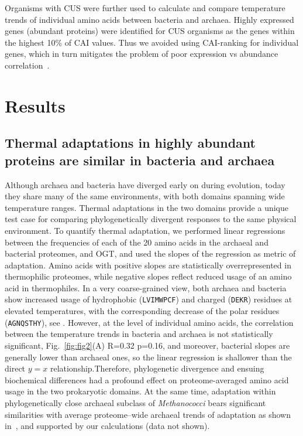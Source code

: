 \documentclass[10pt,letterpaper]{article}
\begin{document}
Organisms with CUS were further used to calculate and compare temperature trends of individual amino acids between bacteria and archaea. Highly expressed genes (abundant proteins) were identified for CUS organisms as the genes within the highest 10\% of CAI values. Thus we avoided using CAI-ranking for individual genes, which in turn mitigates the problem of poor expression vs abundance correlation~\cite{Maier2009Correlation}.


\section*{Results}

\subsection*{Thermal adaptations in highly abundant proteins are similar in bacteria and archaea}

Although archaea and bacteria have diverged early on during evolution, today they share many of the same environments, with both domains spanning wide temperature ranges. Thermal adaptations in the two domains provide a unique test case for comparing phylogenetically divergent responses to the same physical environment. To quantify thermal adaptation, we performed linear regressions between the frequencies of each of the 20 amino acids in the archaeal and bacterial proteomes, and OGT, and used the slopes of the regression as metric of adaptation. Amino acids with positive slopes are statistically overrepresented in thermophilic proteomes, while negative slopes reflect reduced usage  of an amino acid in thermophiles. In a very coarse-grained view, both archaea and bacteria show increased usage of hydrophobic (\texttt{LVIMWPCF}) and charged (\texttt{DEKR}) residues at elevated temperatures, with the corresponding decrease of the polar residues (\texttt{AGNQSTHY}), see . However, at the level of individual amino acids, the correlation between the temperature trends in bacteria and archaea is not statistically significant, Fig.~\ref{fig:fig2}(A) R=0.32 p=0.16, and moreover, bacterial slopes are generally lower than archaeal ones, so the linear regression is shallower than the direct $y=x$ relationship.Therefore, phylogenetic divergence and ensuing biochemical differences had a profound effect on proteome-averaged amino acid usage in the two prokaryotic domains. At the same time, adaptation within phylogenetically close archaeal subclass of {\it Methanococci} bears significant similarities with average proteome--wide archaeal trends of adaptation as shown in~\cite{Haney1999Thermal}, and supported by our calculations (data not shown).
\end{document}
